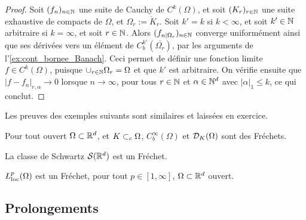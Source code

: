 \begin{proof}
	Soit $(f_n)_{n \in \mathbb{N}}$ une suite de Cauchy de $C^k(\Omega)$, et soit $(K_r)_{r \in \mathbb{N}}$ une suite exhaustive de compacts de $\Omega$, et $\Omega_r := \mathring K_r$. %
	Soit $k' = k$ si $k< \infty$, et soit $k' \in \mathbb{N}$ arbitraire si $k=\infty$, et soit $r \in \mathbb{N}$. Alors $(f_{n|\Omega_r})_{n \in \mathbb{N}}$ converge uniformément ainsi que ses dérivées vers un élément de $C^{k'}_b(\overline{\Omega_r})$, par les arguments de l'\cref{ex:cont_bornee_Banach}.
	Ceci permet de définir une fonction limite $f \in C^k(\Omega)$, puisque $\cup_{r \in \mathbb{N}} \Omega_r = \Omega$ et que $k'$ est arbitraire.
	On vérifie ensuite que $|f-f_n|_{r,\alpha} \to 0$ lorsque $n \to \infty$, pour tous $r \in \mathbb{N}$ et $\alpha \in \mathbb{N}^d$ avec $|\alpha|_1 \leq k$, ce qui conclut. 
\end{proof}

Les preuves des exemples suivants sont similaires et laissées en exercice. 

\begin{exemple}
\label{ex:DKOmegaComplet}
	Pour tout ouvert $\Omega\subset \mathbb{R}^d$, et $K \subset_c \Omega$,  $C^\infty_b(\Omega)$ et $\mathcal{D}_K(\Omega)$ sont des Fréchets. 
\end{exemple}

\begin{exemple}
\label{ex:classeSchwartzFrechet}
	La classe de Schwartz $\mathcal{S}(\mathbb{R}^d)$ est un Fréchet. 
\end{exemple}


\begin{exemple}
\label{ex:LplocFrechet}
	$L^p_{\mathrm{loc}}(\Omega)$ est un Fréchet, pour tout $p\in [1,\infty]$, $\Omega \subset \mathbb{R}^d$ ouvert. 
\end{exemple}
	


\subsection{Prolongements}
\label{subsec:prolongements}

